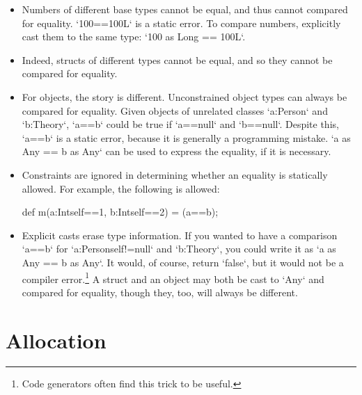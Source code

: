 \begin{itemize}

\item Numbers of different base types cannot be equal, and thus cannot compared for equality.  
\xcd`100==100L` is a static error.  To compare numbers, explicitly cast them
to the same type: \xcd`100 as Long == 100L`.

\item Indeed, structs of different types cannot be equal, and so they cannot be
compared for equality.  

\item For objects, the story is different. Unconstrained object types can
      always be compared for equality. Given objects of unrelated classes
      \xcd`a:Person` and 
      \xcd`b:Theory`, \xcd`a==b` could be true if \xcd`a==null` and
      \xcd`b==null`. Despite this, \xcd`a==b` is a static error, because it is
      generally a programming mistake.  \xcd`a as Any == b as Any` can
      be used to express the equality, if it is necessary.

\item Constraints are ignored in determining whether an equality is statically
      allowed.  For example, the following is allowed: 
\begin{xten}
def m(a:Int{self==1}, b:Int{self==2}) = (a==b);
\end{xten}


\item Explicit casts erase type information.  If you wanted
      to have a comparison \xcd`a==b` for \xcd`a:Person{self!=null}` and
      \xcd`b:Theory`, you could write it as \xcd`a as Any == b as Any`.
      It would, of course, return \xcd`false`, but it would not be a compiler
      error.\footnote{Code generators often find this trick to be useful.}
      A struct and an object may both be cast to \xcd`Any` and compared for
      equality, though they, too, will always be different.

\end{itemize}





\section{Allocation}
\label{ClassCreation}

